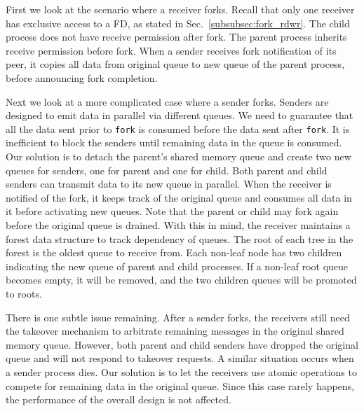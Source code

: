 
First we look at the scenario where a receiver forks. Recall that only one receiver has exclusive access to a FD, as stated in Sec.~\ref{subsubsec:fork_rdwr}. The child process does not have receive permission after fork. The parent process inherits receive permission before fork. When a sender receives fork notification of its peer, it copies all data from original queue to new queue of the parent process, before announcing fork completion.

Next we look at a more complicated case where a sender forks. Senders are designed to emit data in parallel via different queues. We need to guarantee that all the data sent prior to \texttt{fork} is consumed before the data sent after \texttt{fork}. It is inefficient to block the senders until remaining data in the queue is consumed.
Our solution is to detach the parent's shared memory queue and create two new queues for senders, one for parent and one for child. Both parent and child senders can transmit data to its new queue in parallel. When the receiver is notified of the fork, it keeps track of the original queue and consumes all data in it before activating new queues. Note that the parent or child may fork again before the original queue is drained. With this in mind, the receiver maintains a forest data structure to track dependency of queues. The root of each tree in the forest is the oldest queue to receive from. Each non-leaf node has two children indicating the new queue of parent and child processes. If a non-leaf root queue becomes empty, it will be removed, and the two children queues will be promoted to roots.

There is one subtle issue remaining. After a sender forks, the receivers still need the takeover mechanism to arbitrate remaining messages in the original shared memory queue. However, both parent and child senders have dropped the original queue and will not respond to takeover requests. A similar situation occurs when a sender process dies. Our solution is to let the receivers use atomic operations to compete for remaining data in the original queue. Since this case rarely happens, the performance of the overall design is not affected.


